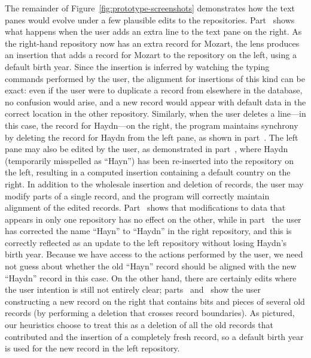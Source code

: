 The remainder of Figure~\ref{fig:prototype-screenshots} demonstrates how the
text panes would evolve under a few plausible edits to the repositories.
Part~ shows what happens when the user adds an
extra line to the text pane on the right. As the right-hand repository now
has an extra record for Mozart, the lens produces an insertion that adds a
record for Mozart to the repository on the left, using a default birth year.
Since the insertion is inferred by watching the typing commands performed by
the user, the alignment for insertions of this kind can be exact: even if
the user were to duplicate a record from elsewhere in the database, no
confusion would arise, and a new record would appear with default data in
the correct location in the other repository. Similarly, when the user
deletes a line---in this case, the record for Haydn---on the right, the
program maintains synchrony by deleting the record for Haydn from the left
pane, as shown in part~. The left pane may also
be edited by the user, as demonstrated in part~,
where Haydn (temporarily misspelled as ``Hayn'') has been re-inserted into
the repository on the left, resulting
in a computed insertion containing a default country on the right. In
addition to the wholesale insertion and deletion of records, the user may
modify parts of a single record, and the program will correctly maintain
alignment of the edited records. Part~ shows that
modifications to data that appears in only one repository has no effect on
the other, while in part~ the user has corrected
the name ``Hayn'' to ``Haydn'' in the right repository, and this is
correctly reflected as an update to the left repository without losing
Haydn's birth year. Because we have access to the actions performed by the
user, we need not guess about whether the old ``Hayn'' record should be
aligned with the new ``Haydn'' record in this case. On the other hand, there
are certainly edits where the user intention is still not entirely clear;
parts~ and~ show the
user constructing a new record on the right that contains bits and pieces of
several old records (by performing a deletion that crosses record
boundaries). As pictured, our heuristics choose to treat this as a deletion
of all the old records that contributed and the insertion of a completely
fresh record, so a default birth year is used for the new record in the left
repository.

